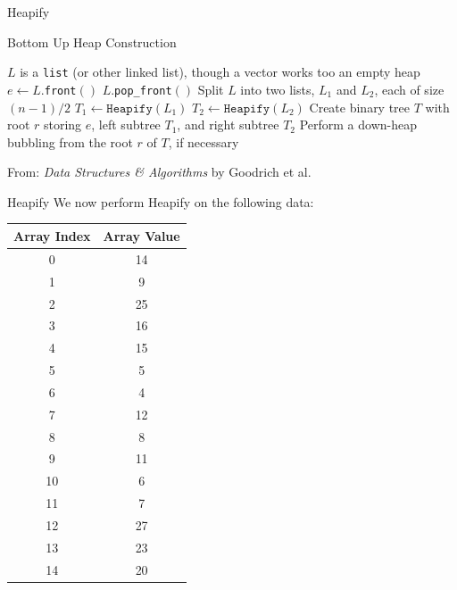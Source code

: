 \documentclass[10pt,compress]{beamer}
\begin{document}
\begin{frame}{Heapify}
  \begin{algorithm}[H]
    \caption{Bottom Up Heap Construction}\label{alg:heapify_2}
    \begin{algorithmic}
      \Require $L$ is a \texttt{list} (or other linked list), though a vector works too
      \State \Return an empty heap
      \EndIf
      \State $e\gets L$.\texttt{front}$()$
      \State $L$.\texttt{pop\_front}$()$
      \State Split $L$ into two lists, $L_1$ and $L_2$, each of size $(n-1)/2$
      \State $T_1\gets\texttt{Heapify}(L_1)$
      \State $T_2\gets\texttt{Heapify}(L_2)$
      \State Create binary tree $T$ with root $r$ storing $e$, left subtree $T_1$, and right subtree $T_2$
      \State Perform a down-heap bubbling from the root $r$ of $T$, if necessary
    \end{algorithmic}
  \end{algorithm}
  From: \textit{Data Structures \& Algorithms} by Goodrich et al.
\end{frame}

\begin{frame}{Heapify}
  We now perform Heapify on the following data:

  \begin{tabular}{c|c}
    Array Index & Array Value \\\hline
    0           & 14          \\
    1           & 9           \\
    2           & 25          \\
    3           & 16          \\
    4           & 15          \\
    5           & 5           \\
    6           & 4           \\
    7           & 12          \\
    8           & 8           \\
    9           & 11          \\
    10          & 6           \\
    11          & 7           \\
    12          & 27          \\
    13          & 23          \\
    14          & 20
  \end{tabular}
\end{frame}
\end{document}
